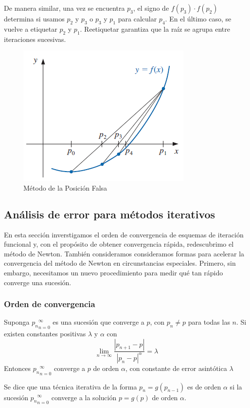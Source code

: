 De manera similar, una vez se encuentra $p_3$, el signo de $f(p_3) \cdot f(p_2)$ determina si usamos $p_2$ y $p_3$ o $p_3$ y $p_1$ para calcular $p_4$. En el último caso, se vuelve a etiquetar $p_2$ y $p_1$. Reetiquetar garantiza que la raíz se agrupa entre iteraciones sucesivas. 

\begin{figure}[h]
    \centering
    \includegraphics[width = 0.5 \textwidth]{Imagenes/6 - Metodo de Posicion Falsa.png}
    \caption{Método de la Posición Falsa}
    \label{fig: Metodo de la Posicion Falsa}
\end{figure}

\subsection{Análisis de error para métodos iterativos}
En esta sección inverstigamos el orden de convergencia de esquemas de iteración funcional y, con el propósito de obtener convergencia rápida, redescubrimo el método de Newton. También consideramos consideramos formas para acelerar la convergencia del método de Newton en circunstancias especiales. Primero, sin embargo, necesitamos un nuevo procedimiento para medir qué tan rápido converge una sucesión.

\subsubsection{Orden de convergencia}
\begin{definition}
    Suponga ${p_n}_{n = 0}^\infty$ es una sucesión que converge a $p$, con $p_n \neq p$ para todas las $n$. Si existen constantes positivas $\lambda$ y $\alpha$ con
    \[ \lim_{n \rightarrow \infty} \frac{|p_{n + 1} - p|}{|p_n - p|^\alpha} = \lambda \]
    Entonces ${p_n}_{n = 0}^\infty$ converge a $p$ de orden $\alpha$, con constante de error asintótica $\lambda$
\end{definition}

Se dice que una técnica iterativa de la forma $p_n = g(p_{n - 1})$ es de orden $\alpha$ si la sucesión ${p_n}_{n = 0}^\infty$ converge a la solución $p = g(p)$ de orden $\alpha$.


